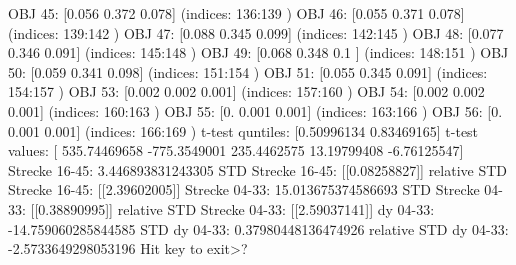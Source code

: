 OBJ 45: [0.056 0.372 0.078] (indices: 136:139 )
OBJ 46: [0.055 0.371 0.078] (indices: 139:142 )
OBJ 47: [0.088 0.345 0.099] (indices: 142:145 )
OBJ 48: [0.077 0.346 0.091] (indices: 145:148 )
OBJ 49: [0.068 0.348 0.1  ] (indices: 148:151 )
OBJ 50: [0.059 0.341 0.098] (indices: 151:154 )
OBJ 51: [0.055 0.345 0.091] (indices: 154:157 )
OBJ 53: [0.002 0.002 0.001] (indices: 157:160 )
OBJ 54: [0.002 0.002 0.001] (indices: 160:163 )
OBJ 55: [0.    0.001 0.001] (indices: 163:166 )
OBJ 56: [0.    0.001 0.001] (indices: 166:169 )
t-test quntiles: [0.50996134 0.83469165]
t-test values: [ 535.74469658 -775.3549001   235.4462575    13.19799408   -6.76125547]
Strecke 16-45: 3.446893831243305
STD Strecke 16-45: [[0.08258827]]
relative STD Strecke 16-45: [[2.39602005]]%
Strecke 04-33: 15.013675374586693
STD Strecke 04-33: [[0.38890995]]
relative STD Strecke 04-33: [[2.59037141]]%
dy 04-33: -14.759060285844585
STD dy 04-33: 0.37980448136474926
relative STD dy 04-33: -2.5733649298053196%
Hit key to exit>? 

